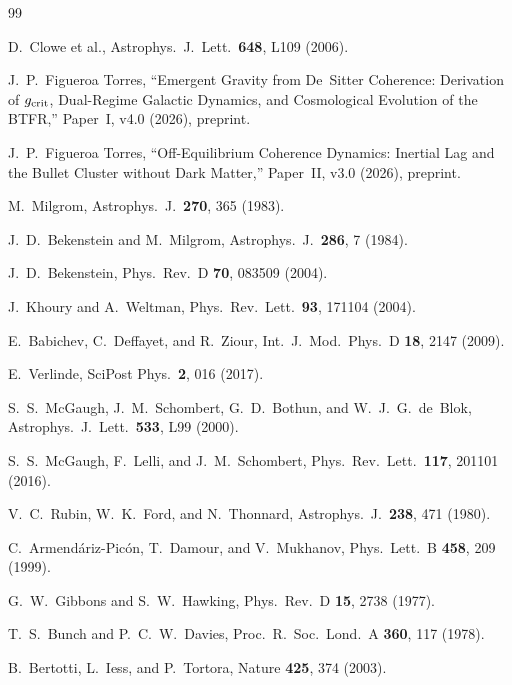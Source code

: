\documentclass[11pt,a4paper]{article}
\begin{document}
\begin{thebibliography}{99}

  D.~Clowe et al.,
  Astrophys.\ J.\ Lett.\ \textbf{648}, L109 (2006).

  J.~P.~Figueroa Torres,
  ``Emergent Gravity from De~Sitter Coherence: Derivation of $g_{\rm crit}$,
  Dual-Regime Galactic Dynamics, and Cosmological Evolution of the BTFR,''
  Paper~I, v4.0 (2026), preprint.

  J.~P.~Figueroa Torres,
  ``Off-Equilibrium Coherence Dynamics: Inertial Lag and the Bullet Cluster
  without Dark Matter,''
  Paper~II, v3.0 (2026), preprint.

  M.~Milgrom,
  Astrophys.\ J.\ \textbf{270}, 365 (1983).

  J.~D.~Bekenstein and M.~Milgrom,
  Astrophys.\ J.\ \textbf{286}, 7 (1984).

  J.~D.~Bekenstein,
  Phys.\ Rev.\ D \textbf{70}, 083509 (2004).

  J.~Khoury and A.~Weltman,
  Phys.\ Rev.\ Lett.\ \textbf{93}, 171104 (2004).

  E.~Babichev, C.~Deffayet, and R.~Ziour,
  Int.\ J.\ Mod.\ Phys.\ D \textbf{18}, 2147 (2009).

  E.~Verlinde,
  SciPost Phys.\ \textbf{2}, 016 (2017).

  S.~S.~McGaugh, J.~M.~Schombert, G.~D.~Bothun, and W.~J.~G.~de~Blok,
  Astrophys.\ J.\ Lett.\ \textbf{533}, L99 (2000).

  S.~S.~McGaugh, F.~Lelli, and J.~M.~Schombert,
  Phys.\ Rev.\ Lett.\ \textbf{117}, 201101 (2016).

  V.~C.~Rubin, W.~K.~Ford, and N.~Thonnard,
  Astrophys.\ J.\ \textbf{238}, 471 (1980).

  C.~Armend\'ariz-Pic\'on, T.~Damour, and V.~Mukhanov,
  Phys.\ Lett.\ B \textbf{458}, 209 (1999).

  G.~W.~Gibbons and S.~W.~Hawking,
  Phys.\ Rev.\ D \textbf{15}, 2738 (1977).

  T.~S.~Bunch and P.~C.~W.~Davies,
  Proc.\ R.\ Soc.\ Lond.\ A \textbf{360}, 117 (1978).

  B.~Bertotti, L.~Iess, and P.~Tortora,
  Nature \textbf{425}, 374 (2003).


\end{thebibliography}
\end{document}
